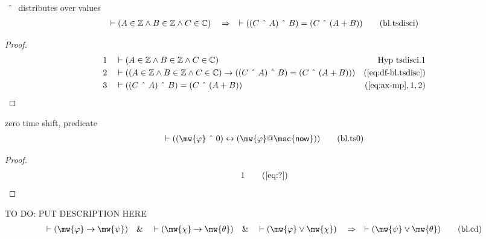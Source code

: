 \begin{lemma} $~\string^~$ distributes over values
\begin{align}
\vdash ( A \in \mathbb{Z} \wedge B \in \mathbb{Z} \wedge C \in \mathbb{C}
    )\quad\Rightarrow\quad \vdash ( ( C ~\string^~ A ) ~\string^~ B ) = ( C
    ~\string^~ ( A + B ) )\label{eq:bl.tsdisci}\tag{bl.tsdisci}
\end{align}
\end{lemma}

\begin{proof}
\begin{align}
  1 &&  & \vdash ( A \in \mathbb{Z} \wedge B \in \mathbb{Z} \wedge C \in \mathbb{C} )&\text{Hyp~tsdisci.1}\notag%
  \\ 2 &&  & \vdash ( ( A \in \mathbb{Z} \wedge B \in \mathbb{Z} \wedge C \in \mathbb{C} ) \rightarrow ( ( C ~\string^~ A ) ~\string^~ B ) = ( C ~\string^~ ( A + B ) ) )&(\mbox{\ref{eq:df-bl.tsdisc}})\notag
  \\ 3 &&  & \vdash ( ( C ~\string^~ A ) ~\string^~ B ) = ( C ~\string^~ ( A + B ) )&(\mbox{\ref{eq:ax-mp}},1,2)\notag
\end{align}
\end{proof}

\begin{lemma} zero time shift, predicate
\begin{align}
\vdash ( ( \mw{\varphi} ~\string^~ 0 ) \leftrightarrow ( \mw{\varphi} @
    \mathsf{\msc{now}} ) )\label{eq:bl.ts0}\tag{bl.ts0}
\end{align}
\end{lemma}

\begin{proof}
\begin{align}
  1 &&  & &(\mbox{\ref{eq:?}})\notag
\end{align}
\end{proof}

\begin{lemma} TO DO: PUT DESCRIPTION HERE
\begin{align}
\vdash ( \mw{\varphi} \rightarrow \mw{\psi} )\quad\&\quad \vdash ( \mw{\chi}
    \rightarrow \mw{\theta} )\quad\&\quad \vdash ( \mw{\varphi} \vee \mw{\chi}
    )\quad\Rightarrow\quad \vdash ( \mw{\psi} \vee \mw{\theta}
    )\label{eq:bl.cd}\tag{bl.cd}
\end{align}
\end{lemma}

